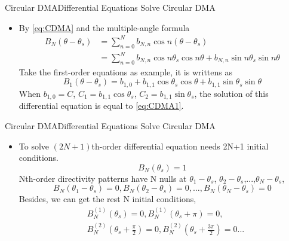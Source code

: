 \documentclass{beamer}
\begin{document}
\begin{frame}{Circular DMA}{Differential Equations Solve Circular DMA}
\begin{itemize}
\item{
By \eqref{eq:CDMA} and the multiple-angle formula
\begin{align}
  {{B}_{N}}(\theta -{{\theta }_{s}}) &=\sum\limits_{n=0}^{N}{{{b}_{N,n}}\cos n(\theta -{{\theta }_{s}})} \\ 
 & =\sum\limits_{n=0}^{N}{{{b}_{N,n}}\cos n{{\theta }_{s}}\cos n\theta +{{b}_{N,n}}\sin n{{\theta }_{s}}\sin n\theta }  
\end{align}
Take the first-order equations as example, it is writtens as
\begin{equation}
\label{eq:CDMA1}
{{B}_{1}}(\theta -{{\theta }_{s}})={{b}_{1,0}}+{{b}_{1,1}}\cos {{\theta }_{s}}\cos \theta +{{b}_{1,1}}\sin {{\theta }_{s}}\sin \theta 
\end{equation}
When ${{b}_{1,0}}=C$, ${{C}_{1}}={{b}_{1,1}}\cos {{\theta }_{s}}$, ${{C}_{2}}={{b}_{1,1}}\sin {{\theta }_{s}}$, the solution of this differential equation is equal to \eqref{eq:CDMA1}.
}
\end{itemize}
	
\end{frame}

\begin{frame}{Circular DMA}{Differential Equations Solve Circular DMA}
\begin{itemize}
\item{
To solve $(2N+1)$th-order differential equation needs 2N+1 initial conditions. 
\begin{equation}
{{B}_{N}}({{\theta }_{s}})=1
\end{equation}
Nth-order directivity patterns have N nulls at ${{\theta }_{1}}-{{\theta }_{s}}$, ${{\theta }_{2}}-{{\theta }_{s}}$,...,${{\theta }_{N}}-{{\theta }_{s}}$,
\begin{equation}
{{B}_{N}}({{\theta }_{1}}-{{\theta }_{s}})=0,{{B}_{N}}({{\theta }_{2}}-{{\theta }_{s}})=0,\ldots ,{{B}_{N}}({{\theta }_{N}}-{{\theta }_{s}})=0
\end{equation}
Besides, we can get the rest N initial conditions,
\begin{equation}
\begin{align}
  & B_{N}^{(1)}({{\theta }_{s}})=0,B_{N}^{(1)}({{\theta }_{s}}+\pi )=0, \\ 
 & B_{N}^{(2)}({{\theta }_{s}}+\frac{\pi }{2})=0,B_{N}^{(2)}({{\theta }_{s}}+\frac{3\pi }{2})=0... \\ 
\end{align}
\end{equation}

}
\end{itemize}
	
\end{frame}
\end{document}
